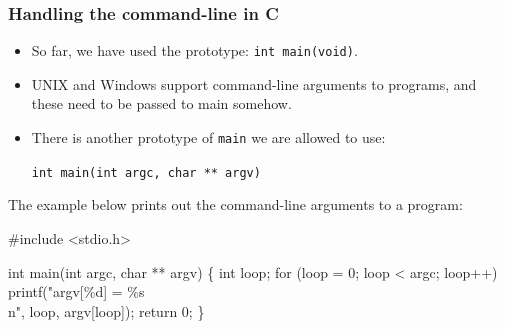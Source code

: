 \documentclass[table]{beamer}
\newif\ifschigh\schighfalse
\newcommand{\kw}[1]{\ifschigh\textcolor{red}{#1}\else\textcolor{keyword}{#1}\fi}
\newcommand{\kt}[1]{\ifschigh\textcolor{red}{#1}\else\textcolor{ctext}{#1}\fi}
\begin{document}
\begin{frame}[fragile]
\frametitle{Handling the command-line in C}
\begin{itemize}
\item So far, we have used the prototype: {\tt \kw{int} main(\kw{void})}.
\item UNIX and Windows support command-line arguments to programs, and these need to be passed to main somehow.
\item There is another prototype of {\tt main} we are allowed to use:\\
\begin{center}
\tt \kw{int} main(\kw{int} argc, \kw{char} ** argv)
\end{center}
\end{itemize}
The example below prints out the command-line arguments to a program:
\vspace{-0.1in}
\begin{semiverbatim}
\small
\kw{\#include} \kt{<stdio.h>}

\kw{int} main(\kw{int} argc, \kw{char} ** argv)
\{
   \kw{int} loop;
   \kw{for} (loop = 0; loop < argc; loop++)
      printf(\kt{"argv[\%d] = \%s\\n"}, loop, argv[loop]);
   \kw{return} 0;
\}
\end{semiverbatim}
\end{frame}


\newcommand{\scs}[1]{\scriptsize \sc#1}
\newcommand{\scc}[1]{$\mathtt{\backslash}$\tt#1}
\end{document}
